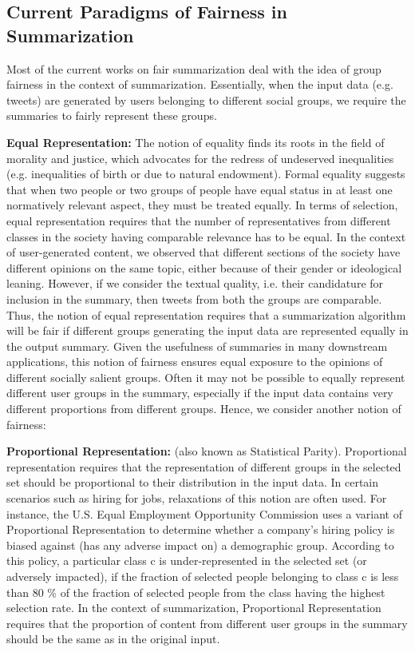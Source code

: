 \subsection{Current Paradigms of Fairness in Summarization}
{Most of the current works on fair summarization deal with the idea of group fairness in the context of summarization. Essentially, when the input data (e.g. tweets) are generated by users belonging to different social groups, we require the summaries to fairly represent these groups. 


\textbf{Equal Representation:} The notion of equality finds its roots in the field of morality and justice, which advocates for the redress of undeserved inequalities (e.g. inequalities of birth or due to natural endowment)\cite{rawls2009theory}. Formal equality suggests that when two people or two groups of people have equal status in at least one normatively relevant aspect, they must be treated equally\cite{sep-equality}. In terms of selection, equal representation requires that the number of representatives from different classes in the society having comparable relevance has to be equal. In the context of user-generated content, we observed that different sections of the society have different opinions on the same topic, either because of their gender or ideological leaning\cite{babaei2018purple}. However, if we consider the textual quality, i.e. their candidature for inclusion in the summary, then tweets from both the groups are comparable. Thus, the notion of equal representation requires that a summarization algorithm will be fair if different groups generating the input data are represented equally in the output summary. Given the usefulness of summaries in many downstream applications, this notion of fairness ensures equal exposure to the opinions of different socially salient groups.
Often it may not be possible to equally represent different user groups in the summary, especially if the input data contains very different proportions from different groups. Hence, we consider another notion of fairness: 

\textbf{Proportional Representation:} (also known as Statistical Parity\cite{luong2011k}). Proportional representation requires that the representation of different groups in the selected set should be proportional to their distribution in the input data. In certain scenarios such as hiring for jobs, relaxations of this notion are often used. For instance, the U.S. Equal Employment Opportunity Commission uses a variant of Proportional Representation to determine whether a company’s hiring policy is biased against (has any adverse impact on) a demographic group\cite{gajane2017formalizing}. According to this policy, a particular class c is under-represented in the selected set (or adversely impacted), if the fraction of selected people belonging to class c is less than 80 \% of the fraction of selected people from the class having the highest selection rate. In the context of summarization, Proportional Representation requires that the proportion of content from different user groups in the summary should be the same as in the original input.

}
